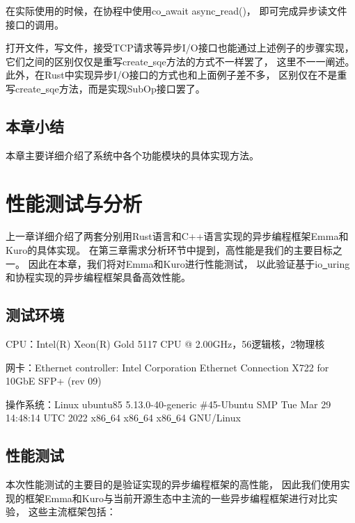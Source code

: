 \documentclass[supercite]{HustGraduPaper}
\theoremstyle{definition}
\begin{document}
在实际使用的时候，在协程中使用co\underline{~}await async\underline{~}read()，
即可完成异步读文件接口的调用。\par

打开文件，写文件，接受TCP请求等异步I/O接口也能通过上述例子的步骤实现，
它们之间的区别仅仅是重写create\underline{~}sqe方法的方式不一样罢了，
这里不一一阐述。此外，在Rust中实现异步I/O接口的方式也和上面例子差不多，
区别仅在不是重写create\underline{~}sqe方法，而是实现SubOp接口罢了。\par

\subsection{本章小结}

本章主要详细介绍了系统中各个功能模块的具体实现方法。\par

\section{性能测试与分析}
上一章详细介绍了两套分别用Rust语言和C++语言实现的异步编程框架Emma和Kuro的具体实现。
在第三章需求分析环节中提到，高性能是我们的主要目标之一。
因此在本章，我们将对Emma和Kuro进行性能测试，
以此验证基于io\underline{~}uring和协程实现的异步编程框架具备高效性能。\par

\subsection{测试环境}
CPU：Intel(R) Xeon(R) Gold 5117 CPU @ 2.00GHz，56逻辑核，2物理核\par

网卡：Ethernet controller: Intel Corporation Ethernet Connection X722 for 10GbE SFP+ (rev 09)\par

操作系统：Linux ubuntu85 5.13.0-40-generic \#45-Ubuntu SMP Tue Mar 29 14:48:14 UTC 2022 x86\underline{~}64 x86\underline{~}64 x86\underline{~}64 GNU/Linux\par

\subsection{性能测试}

本次性能测试的主要目的是验证实现的异步编程框架的高性能，
因此我们使用实现的框架Emma和Kuro与当前开源生态中主流的一些异步编程框架进行对比实验，
这些主流框架包括：
\end{document}

